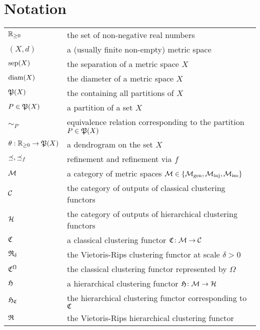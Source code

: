 \chapter{Notation}
\begin{tabular}{ll}
$\R_{\geq0}$ & the set of non-negative real numbers\\

$(X,d)$ & a (usually finite non-empty) metric space\\
$\sep(X)$ & the separation of a metric space $X$\\
$\diam(X)$ & the diameter of a metric space $X$\\

$\P(X)$ & the containing all partitions of $X$\\
$P \in \P(X)$ & a partition of a set $X$\\
$\sim_P$ & equivalence relation corresponding to the partition $P \in \P(X)$\\

$\theta: \R_{\geq0} \to \P(X)$ & a dendrogram on the set $X$\\

$\refines, \refines_f$ & refinement and refinement via $f$\\

$\M$ & a category of metric spaces $\M \in \{\gen, \inj, \iso\}$\\
$\C$ & the category of outputs of classical clustering functors\\
$\H$ & the category of outputs of hierarchical clustering functors\\

$\Cf$ & a classical clustering functor $\Cf\colon \M \to \C$\\
$\Rf_\delta$ & the Vietoris-Rips clustering functor at scale $\delta>0$\\
$\Cf^\Omega$ & the classical clustering functor represented by $\Omega$\\

$\Hf$ & a hierarchical clustering functor $\Hf\colon \M \to \H$\\
$\Hf_\Cf$ & the hierarchical clustering functor corresponding to $\Cf$\\
$\Rf$ & the Vietoris-Rips hierarchical clustering functor\\

\end{tabular}